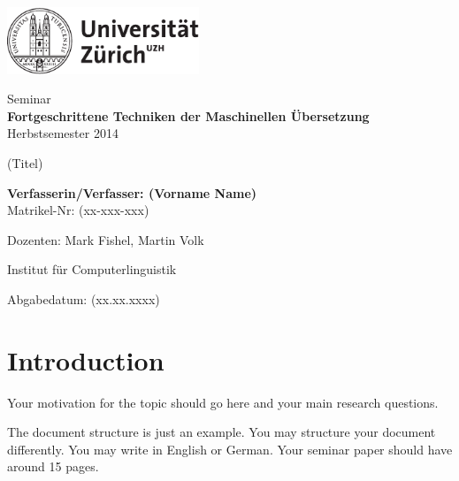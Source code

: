 \documentclass[11pt]{article}
\begin{document}
\begin{titlepage}
\includegraphics[height=20mm]{uzh_logo_d_pos}\\

\begin{center}

{\sffamily
Seminar \\
\textbf{Fortgeschrittene Techniken der Maschinellen Übersetzung} \\
Herbstsemester 2014 \\

\vspace{2cm}

{\Huge (Titel)}\\

\vspace{4cm}

\textbf{Verfasserin/Verfasser: (Vorname Name)} \\
	Matrikel-Nr: (xx-xxx-xxx) \\

\vspace{2cm}

Dozenten: Mark Fishel, Martin Volk


Institut f\"ur Computerlinguistik

\vfill Abgabedatum: (xx.xx.xxxx) 

\vspace{3cm}
}
\end{center}

\end{titlepage}

\newpage





\section{Introduction}

Your motivation for the topic should go here and your main research questions. 

The document structure is just an example. You may structure your document differently. You may write in English or German. Your seminar paper should have around 15 pages.
\end{document}
